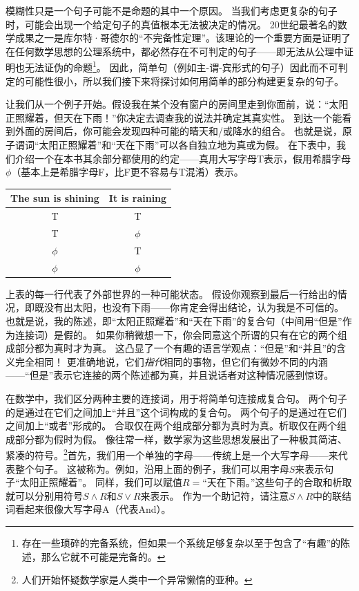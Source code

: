 模糊性只是一个句子可能不是命题的其中一个原因。
当我们考虑更复杂的句子时，可能会出现一个给定句子的真值根本无法被决定的情况。
20世纪最著名的数学成果之一是库尔特·哥德尔的“不完备性定理”。该理论的一个重要方面是证明了在任何数学思想的公理系统中，都必然存在不可判定的句子——即无法从公理中证明也无法证伪的命题\footnote{存在一些琐碎的完备系统，但如果一个系统足够复杂以至于包含了“有趣”的陈述，那么它就不可能是完备的。}。
因此，简单句（例如主-谓-宾形式的句子）因此而不可判定的可能性很小，所以我们接下来将探讨如何用简单的部分构建更复杂的句子。

让我们从一个例子开始。假设我在某个没有窗户的房间里走到你面前，说：“太阳正照耀着，但天在下雨！”你决定去调查我的说法并确定其真实性。
到达一个能看到外面的房间后，你可能会发现四种可能的晴天和/或降水的组合。
也就是说，原子谓词“太阳正照耀着”和“天在下雨”可以各自独立地为真或为假。
在下表中，我们介绍一个在本书其余部分都使用的约定——真用大写字母T表示，假用希腊字母$\phi$（基本上是希腊字母F，比F更不容易与T混淆）表示。

\begin{center}
\begin{tabular}{c|c}
The sun is shining \; & \; It is raining \\ \hline
T & T \\
T & $\phi$ \\
 $\phi$ & T \\
 $\phi$ &  $\phi$ \\
\end{tabular}
\end{center}


上表的每一行代表了外部世界的一种可能状态。
假设你观察到最后一行给出的情况，即既没有出太阳，也没有下雨——你肯定会得出结论，认为我是不可信的。
也就是说，我的陈述，即“太阳正照耀着”和“天在下雨”的复合句（中间用“但是”作为连接词）是假的。
如果你稍微想一下，你会同意这个所谓的只有在它的两个组成部分都为真时才为真。
这凸显了一个有趣的语言学观点：“但是”和“并且”的含义完全相同！
更准确地说，它们{\em 指代}相同的事物，但它们有微妙不同的内涵——“但是”表示它连接的两个陈述都为真，并且说话者对这种情况感到惊讶。

在数学中，我们区分两种主要的连接词，用于将简单句连接成复合句。
两个句子的是通过在它们之间加上“并且”这个词构成的复合句。
两个句子的是通过在它们之间加上“或者”形成的。
合取仅在两个组成部分都为真时为真。析取仅在两个组成部分都为假时为假。
像往常一样，数学家为这些思想发展出了一种极其简洁、紧凑的符号。\footnote{人们开始怀疑数学家是人类中一个异常懒惰的亚种。}首先，我们用一个单独的字母——传统上是一个大写字母——来代表整个句子。
这被称为。例如，沿用上面的例子，我们可以用字母$S$来表示句子“太阳正照耀着”。
同样，我们可以赋值$R=$“天在下雨。”这些句子的合取和析取就可以分别用符号$S \land R$和$S \lor R$来表示。
作为一个助记符，请注意$S \land R$中的联结词看起来很像大写字母A（代表And）。

